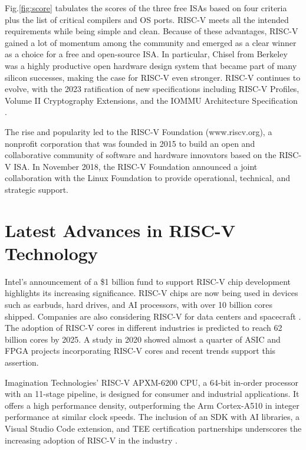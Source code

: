 \documentclass[journal]{IEEEtran}
\begin{document}
Fig.\ref{fig:score} tabulates the scores of the three free ISAs based on four criteria plus the list of critical compilers and OS ports. RISC-V meets all the intended requirements while being simple and clean. Because of these advantages, RISC-V gained a lot of momentum among the community and emerged as a clear winner as a choice for a free and open-source ISA. In particular, Chisel \cite{bachrach_chisel_2012} from Berkeley was a highly productive open hardware design system that became part of many silicon successes, making the case for RISC-V even stronger. 
RISC-V continues to evolve, with the 2023 ratification of new specifications including RISC-V Profiles, Volume II Cryptography Extensions, and the IOMMU Architecture Specification \cite{mcmahon_risc-v_nodate}.

The rise and popularity led to the RISC-V Foundation (www.riscv.org), a nonprofit corporation that was founded in 2015 to build an open and collaborative community of software and hardware innovators based on the RISC-V ISA. In November 2018, the RISC-V Foundation announced a joint collaboration with the Linux Foundation to provide operational, technical, and strategic support.

\section{Latest Advances in RISC-V Technology}
Intel's announcement of a \$1 billion fund to support RISC-V chip development highlights its increasing significance. RISC-V chips are now being used in devices such as earbuds, hard drives, and AI processors, with over 10 billion cores shipped. Companies are also considering RISC-V for data centers and spacecraft \cite{c_chip_nodate}.
The adoption of RISC-V cores in different industries is predicted to reach 62 billion cores by 2025. A study in 2020 showed almost a quarter of ASIC and FPGA projects incorporating RISC-V cores \cite{redmond_risc-v_2021} and recent trends support this assertion.

Imagination Technologies' RISC-V APXM-6200 CPU, a 64-bit in-order processor with an 11-stage pipeline, is designed for consumer and industrial applications. It offers a high performance density, outperforming the Arm Cortex-A510 in integer performance at similar clock speeds. The inclusion of an SDK with AI libraries, a Visual Studio Code extension, and TEE certification partnerships underscores the increasing adoption of RISC-V in the industry \cite{krewell_imagination_2024}.
\end{document}
